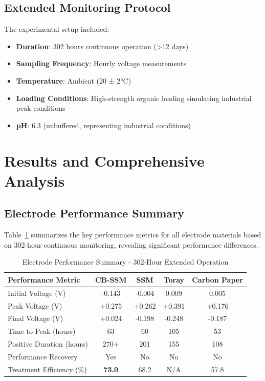 \documentclass[12pt,a4paper]{article}
\begin{document}
\subsection{Extended Monitoring Protocol}

The experimental setup included:
\begin{itemize}
    \item \textbf{Duration}: 302 hours continuous operation (>12 days)
    \item \textbf{Sampling Frequency}: Hourly voltage measurements
    \item \textbf{Temperature}: Ambient (20 ± 2°C)
    \item \textbf{Loading Conditions}: High-strength organic loading simulating industrial peak conditions
    \item \textbf{pH}: 6.3 (unbuffered, representing industrial conditions)
\end{itemize}

\section{Results and Comprehensive Analysis}

\subsection{Electrode Performance Summary}

Table~\ref{tab:performance_summary} summarizes the key performance metrics for all electrode materials based on 302-hour continuous monitoring, revealing significant performance differences.

\begin{table}[htbp]
\centering
\caption{Electrode Performance Summary - 302-Hour Extended Operation}
\label{tab:performance_summary}
\begin{tabular}{@{}lcccc@{}}
\toprule
\textbf{Performance Metric} & \textbf{CB-SSM} & \textbf{SSM} & \textbf{Toray} & \textbf{Carbon Paper} \\
\midrule
Initial Voltage (V) & -0.143 & -0.004 & 0.009 & 0.005 \\
Peak Voltage (V) & +0.275 & +0.262 & +0.391 & +0.176 \\
Final Voltage (V) & +0.024 & -0.198 & -0.248 & -0.187 \\
Time to Peak (hours) & 63 & 60 & 105 & 53 \\
Positive Duration (hours) & 270+ & 201 & 155 & 108 \\
Performance Recovery & Yes & No & No & No \\
Treatment Efficiency (\%) & \textbf{73.0} & 68.2 & N/A & 57.8 \\
\bottomrule
\end{tabular}
\end{table}
\end{document}

